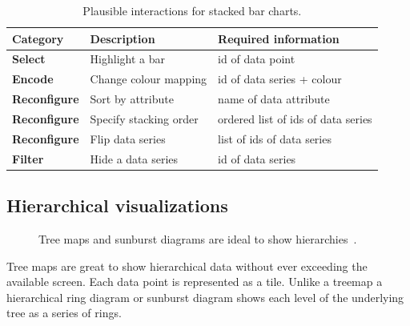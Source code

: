 \begin{table}[H]
  \caption{Plausible interactions for stacked bar charts.}%
  \label{tab:analysis:stacked-bar-chart:interactions}
  \begin{tabularx}{\linewidth}{lXX}
    \bf Category & \bf Description & \bf Required information \\
    \hline
    \bf Select & Highlight a bar & id of data point \\
    \bf Encode & Change colour mapping & id of data series + colour \\
    \bf Reconfigure & Sort by attribute & name of data attribute \\
    \bf Reconfigure & Specify stacking order & ordered list of ids of data series \\
    \bf Reconfigure & Flip data series & list of ids of data series \\
    \bf Filter & Hide a data series & id of data series \\
  \end{tabularx}
\end{table}


\subsection{Hierarchical visualizations}

\begin{figure}
  \centering
  \qquad
  \caption{Tree maps and sunburst diagrams are ideal to show hierarchies~\parencite{VisualizationCatalogue2017}.}%
  \label{fig:analysis:hierarchies}
\end{figure}

Tree maps are great to show hierarchical data without ever exceeding the available screen.
Each data point is represented as a tile.
Unlike a treemap a hierarchical ring diagram or sunburst diagram shows each level of the underlying tree as a series of rings.

